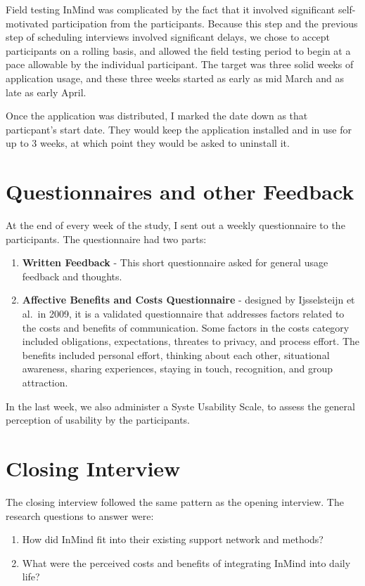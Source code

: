   Field testing InMind was complicated by the fact that it involved
  significant self-motivated participation from the participants.
  Because this step and the previous step of scheduling interviews
  involved significant delays,
  we chose to accept participants on a rolling basis,
  and allowed the field testing period to begin at a pace allowable
  by the individual participant.
  The target was three solid weeks of application usage,
  and these three weeks started as early as mid March
  and as late as early April.

  Once the application was distributed,
  I marked the date down as that particpant's start date.
  They would keep the application installed and in use for up to 3 weeks,
  at which point they would be asked to uninstall it.

\section{Questionnaires and other Feedback}
  At the end of every week of the study,
  I sent out a weekly questionnaire to the participants.
  The questionnaire had two parts:
  \begin{enumerate}
  \item \textbf{Written Feedback} -
  This short questionnaire asked for
  general usage feedback and thoughts.

  \item \textbf{Affective Benefits and Costs Questionnaire} -
  designed by Ijsselsteijn et al.\ in 2009,
  it is a validated questionnaire that
  addresses factors related to the costs and benefits of communication.
  Some factors in the costs category included obligations,
  expectations, threates to privacy, and process effort.
  The benefits included personal effort,
  thinking about each other,
  situational awareness,
  sharing experiences,
  staying in touch,
  recognition,
  and group attraction.
  \end{enumerate}

	In the last week, we also administer a Syste Usability Scale,
	to assess the general perception of usability by the participants.

\section{Closing Interview}
  The closing interview followed the same pattern as the opening interview.
  The research questions to answer were:
  \begin{enumerate}
  \item How did InMind fit into their existing support network and methods?
  \item What were the perceived costs and benefits of integrating InMind
  into daily life?
  \end{enumerate}

